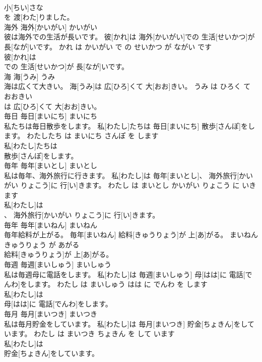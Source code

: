 \documentclass[8pt]{extreport}
\begin{document}
\begin{CJK}{UTF8}{min}
\\	小[ちい]さな
\\	を 渡[わた]りました。			
\\	海外	海外[かいがい]	かいがい	
\\	彼は海外での生活が長いです。	彼[かれ]は 海外[かいがい]での 生活[せいかつ]が 長[なが]いです。	かれ は かいがい で の せいかつ が ながい です	
\\	彼[かれ]は
\\	での 生活[せいかつ]が 長[なが]いです。			
\\	海	海[うみ]	うみ	
\\	海は広くて大きい。	海[うみ]は 広[ひろ]くて 大[おお]きい。	うみ は ひろく て おおきい	
\\	は 広[ひろ]くて 大[おお]きい。			
\\	毎日	毎日[まいにち]	まいにち	
\\	私たちは毎日散歩をします。	私[わたし]たちは 毎日[まいにち] 散歩[さんぽ]をします。	わたしたち は まいにち さんぽ を します	
\\	私[わたし]たちは
\\	散歩[さんぽ]をします。			
\\	毎年	毎年[まいとし]	まいとし	
\\	私は毎年、海外旅行に行きます。	私[わたし]は 毎年[まいとし]、 海外旅行[かいがい りょこう]に 行[い]きます。	わたし は まいとし かいがい りょこう に いきます	
\\	私[わたし]は
\\	、 海外旅行[かいがい りょこう]に 行[い]きます。			
\\	毎年	毎年[まいねん]	まいねん	
\\	毎年給料が上がる。	毎年[まいねん] 給料[きゅうりょう]が 上[あ]がる。	まいねん きゅうりょう が あがる	
\\	給料[きゅうりょう]が 上[あ]がる。			
\\	毎週	毎週[まいしゅう]	まいしゅう	
\\	私は毎週母に電話をします。	私[わたし]は 毎週[まいしゅう] 母[はは]に 電話[でんわ]をします。	わたし は まいしゅう はは に でんわ を します	
\\	私[わたし]は
\\	母[はは]に 電話[でんわ]をします。			
\\	毎月	毎月[まいつき]	まいつき	
\\	私は毎月貯金をしています。	私[わたし]は 毎月[まいつき] 貯金[ちょきん]をしています。	わたし は まいつき ちょきん を して います	
\\	私[わたし]は
\\	貯金[ちょきん]をしています。			

\end{CJK}
\end{document}
